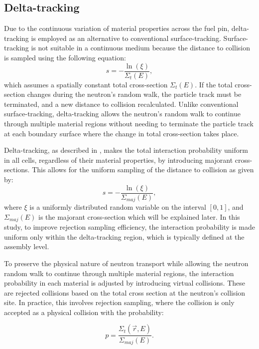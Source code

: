 \subsection{Delta-tracking} \label{sec23}
Due to the continuous variation of material properties across the fuel pin, delta-tracking is employed as an alternative to conventional surface-tracking. Surface-tracking is not suitable in a continuous medium because the distance to collision is sampled using the following equation:
\begin{equation}
    s = -\frac{\ln(\xi)}{\Sigma_{t}(E)},
    \label{eq8}
\end{equation}
which assumes a spatially constant total cross-section $\Sigma_{t}(E)$. If the total cross-section changes during the neutron's random walk, the particle track must be terminated, and a new distance to collision recalculated. Unlike conventional surface-tracking, delta-tracking allows the neutron's random walk to continue through multiple material regions without needing to terminate the particle track at each boundary surface where the change in total cross-section takes place.

Delta-tracking, as described in \cite{leppanen_2017, woodcock}, makes the total interaction probability uniform in all cells, regardless of their material properties, by introducing majorant cross-sections. This allows for the uniform sampling of the distance to collision as given by:
\begin{equation}
    s = -\frac{\ln{\left(\xi\right)}}{\Sigma_{maj}(E)},
    \label{eq8}
\end{equation}
where \(\xi\) is a uniformly distributed random variable on the interval \([0,1]\), and \(\Sigma_{maj}(E)\) is the majorant cross-section which will be explained later. In this study, to improve rejection sampling efficiency, the interaction probability is made uniform only within the delta-tracking region, which is typically defined at the assembly level. 

To preserve the physical nature of neutron transport while allowing the neutron random walk to continue through multiple material regions, the interaction probability in each material is adjusted by introducing virtual collisions. These are rejected collisions based on the total cross section at the neutron's collision site. In practice, this involves rejection sampling, where the collision is only accepted as a physical collision with the probability:

\begin{equation}
    p = \frac{\Sigma_t(\vec{r},E)}{\Sigma_{maj}(E)}.
    \label{eq9}
\end{equation}

